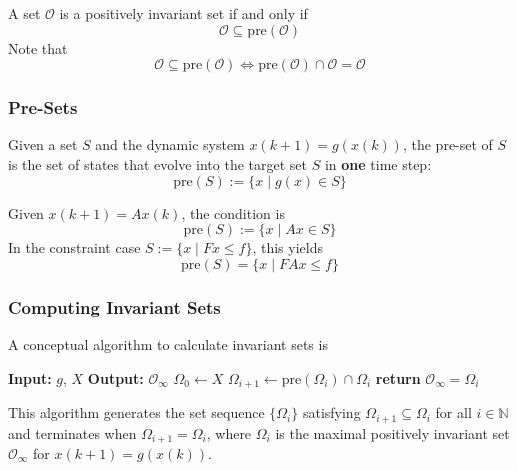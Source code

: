 \newpar{}

A set $\mathcal{O}$ is a positively invariant set if and only if
\begin{equation*}
    \mathcal{O} \subseteq \text{pre}(\mathcal{O})
\end{equation*}
Note that
\begin{equation*}
    \mathcal{O} \subseteq \text{pre}(\mathcal{O}) \iff \text{pre}(\mathcal{O})\cap \mathcal{O} = \mathcal{O}
\end{equation*}
\subsubsection{Pre-Sets}

Given a set $S$ and the dynamic system $x(k + 1) = g(x(k))$, the pre-set of $S$ is the set of states that evolve into the target set $S$ in \textbf{one} time step:
\begin{equation*}
    \text{pre}(S) := \{x \mid g(x) \in S \}
\end{equation*}

\newpar{}

Given $x(k + 1) = A x(k)$, the condition is
\begin{equation*}
    \text{pre}(S) := \{x \mid A x \in S \}
\end{equation*}
In the constraint case $S := \{x \mid F x \leq f \}$, this yields
\begin{equation*}
    \text{pre}(S) = \{x \mid F A x \leq f \}
\end{equation*}

\subsubsection{Computing Invariant Sets}
A conceptual algorithm to calculate invariant sets is
\begin{algorithmic}
    \State{} \textbf{Input:} $g$, $X$
    \State{} \textbf{Output:} $\mathcal{O}_\infty$
    \State{} $\Omega_0 \gets X$
    \State{} $\Omega_{i+1} \gets \text{pre}(\Omega_i) \cap \Omega_i$
    \State{} \textbf{return} $\mathcal{O}_\infty = \Omega_i$
    \EndIf{}
    \EndWhile{}
\end{algorithmic}
This algorithm generates the set sequence $\{\Omega_i\}$ satisfying $\Omega_{i+1} \subseteq \Omega_i$ for all $i \in \mathbb{N}$ and terminates when $\Omega_{i+1} = \Omega_i$, where $\Omega_i$ is the maximal positively invariant set $\mathcal{O}_\infty$ for $x(k + 1) = g(x(k))$.

